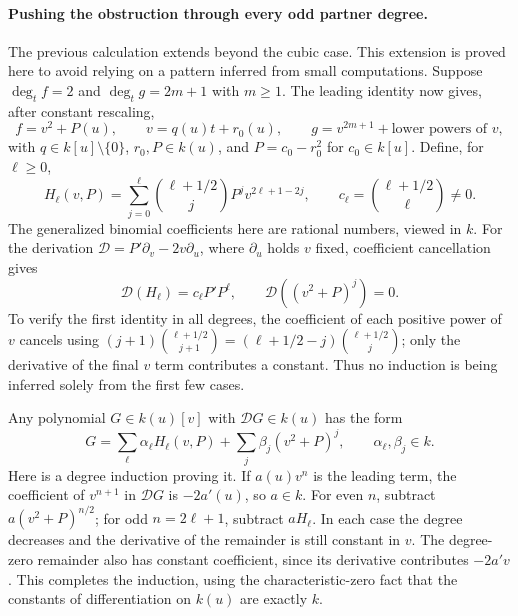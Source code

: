 \documentclass[11pt]{article}
\begin{document}
\paragraph{Pushing the obstruction through every odd partner degree.}
The previous calculation extends beyond the cubic case. This extension is
proved here to avoid relying on a pattern inferred from small computations.
Suppose $\deg_t f=2$ and $\deg_t g=2m+1$ with $m\ge1$. The leading identity
now gives, after constant rescaling,
\[
 f=v^2+P(u),\qquad v=q(u)t+r_0(u),\qquad
 g=v^{2m+1}+\text{lower powers of }v,
\]
with $q\in k[u]\setminus\{0\}$, $r_0,P\in k(u)$, and
$P=c_0-r_0^2$ for $c_0\in k[u]$. Define, for $\ell\ge0$,
\begin{equation}\label{ra103:oddforms}
 H_\ell(v,P)=\sum_{j=0}^{\ell}
   \binom{\ell+1/2}{j}P^jv^{2\ell+1-2j},
 \qquad
 c_\ell=\binom{\ell+1/2}{\ell}\ne0.
\end{equation}
The generalized binomial coefficients here are rational numbers, viewed in
$k$. For the derivation
$\mathcal D=P'\partial_v-2v\partial_u$, where $\partial_u$ holds $v$ fixed,
coefficient cancellation gives
\begin{equation}\label{ra103:derivation}
 \mathcal D(H_\ell)=c_\ell P'P^\ell,
 \qquad \mathcal D((v^2+P)^j)=0.
\end{equation}
To verify the first identity in all degrees, the coefficient of each positive
power of $v$ cancels using
$(j+1)\binom{\ell+1/2}{j+1}
 =(\ell+1/2-j)\binom{\ell+1/2}{j}$; only the derivative of the final
$v$ term contributes a constant. Thus no induction is being inferred solely
from the first few cases.

Any polynomial $G\in k(u)[v]$ with $\mathcal D G\in k(u)$ has the form
\begin{equation}\label{ra103:classification}
 G=\sum_{\ell}\alpha_\ell H_\ell(v,P)
      +\sum_j\beta_j(v^2+P)^j,
 \qquad\alpha_\ell,\beta_j\in k.
\end{equation}
Here is a degree induction proving it. If $a(u)v^n$ is the leading term,
the coefficient of $v^{n+1}$ in $\mathcal DG$ is $-2a'(u)$, so $a\in k$.
For even $n$, subtract $a(v^2+P)^{n/2}$; for odd $n=2\ell+1$, subtract
$aH_\ell$. In each case the degree decreases and the derivative of the
remainder is still constant in $v$. The degree-zero remainder also has
constant coefficient, since its derivative contributes $-2a'v$.
This completes the induction, using the characteristic-zero fact that the
constants of differentiation on $k(u)$ are exactly $k$.
\end{document}
